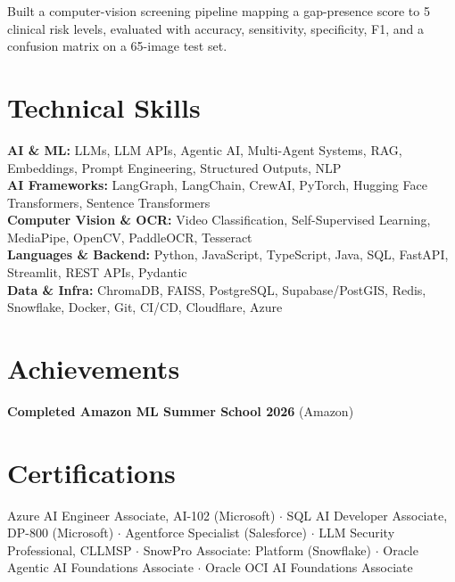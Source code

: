 \documentclass[a4paper,10pt]{article}
\begin{document}
\begin{points}
  \item Built a computer-vision screening pipeline mapping a gap-presence score to 5 clinical risk levels, evaluated with accuracy, sensitivity, specificity, F1, and a confusion matrix on a 65-image test set.
\end{points}

\section{Technical Skills}
{\small
\textbf{AI \& ML:} LLMs, LLM APIs, Agentic AI, Multi-Agent Systems, RAG, Embeddings, Prompt Engineering, Structured Outputs, NLP\\
\textbf{AI Frameworks:} LangGraph, LangChain, CrewAI, PyTorch, Hugging Face Transformers, Sentence Transformers\\
\textbf{Computer Vision \& OCR:} Video Classification, Self-Supervised Learning, MediaPipe, OpenCV, PaddleOCR, Tesseract\\
\textbf{Languages \& Backend:} Python, JavaScript, TypeScript, Java, SQL, FastAPI, Streamlit, REST APIs, Pydantic\\
\textbf{Data \& Infra:} ChromaDB, FAISS, PostgreSQL, Supabase/PostGIS, Redis, Snowflake, Docker, Git, CI/CD, Cloudflare, Azure}

\section{Achievements}
\begin{points}
  \item \ieeepaper
  \item \textbf{Completed Amazon ML Summer School 2026} (Amazon)
\end{points}

\section{Certifications}
{\small
Azure AI Engineer Associate, AI-102 (Microsoft) $\cdot$ SQL AI Developer Associate, DP-800 (Microsoft) $\cdot$ Agentforce Specialist (Salesforce) $\cdot$ LLM Security Professional, CLLMSP $\cdot$ SnowPro Associate: Platform (Snowflake) $\cdot$ Oracle Agentic AI Foundations Associate $\cdot$ Oracle OCI AI Foundations Associate}
\end{document}
